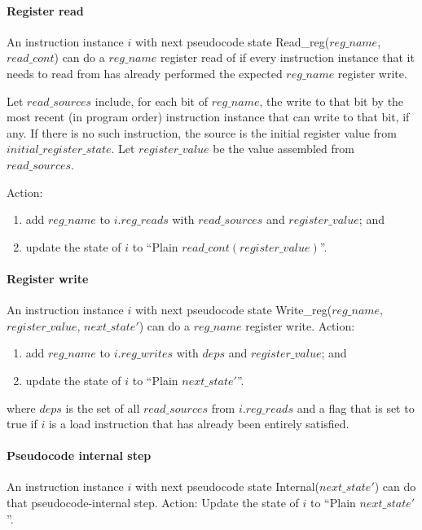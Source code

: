 \paragraph{Register read}\label{omm:reg_read}
An instruction instance $i$ with next pseudocode state {\sc Read\_reg}($reg\_name$, $read\_cont$) can do a $reg\_name$ register read of if every instruction instance that it needs to read from has already performed the expected $reg\_name$ register write.

Let $read\_sources$ include, for each bit of $reg\_name$, the write to that bit by the most recent (in program order) instruction instance that can write to that bit, if any. If there is no such instruction, the source is the initial register value from $initial\_register\_state$.
Let  $register\_value$ be the value assembled from $read\_sources$.

Action:
\begin{enumerate}
\item add $reg\_name$ to $i.reg\_reads$ with $read\_sources$ and $register\_value$; and
\item update the state of $i$ to ``{\sc Plain} $read\_cont(register\_value)$''.
\end{enumerate}


\paragraph{Register write}\label{omm:reg_write}
An instruction instance $i$ with next pseudocode state {\sc Write\_reg}($reg\_name$, $register\_value$, $next\_state'$) can do a $reg\_name$ register write.
Action:
\begin{enumerate}
\item add $reg\_name$ to $i.reg\_writes$ with $deps$ and $register\_value$; and
\item update the state of $i$ to ``{\sc Plain} $next\_state'$''.
\end{enumerate}
where $deps$ is the set of all $read\_sources$ from $i.reg\_reads$ and a flag that is set to true if $i$ is a load instruction that has already been entirely satisfied.


\paragraph{Pseudocode internal step}\label{omm:sail_interp}
An instruction instance $i$ with next pseudocode state {\sc Internal}($next\_state'$) can do that pseudocode-internal step.
Action: Update the state of $i$ to ``{\sc Plain} $next\_state'$''.


